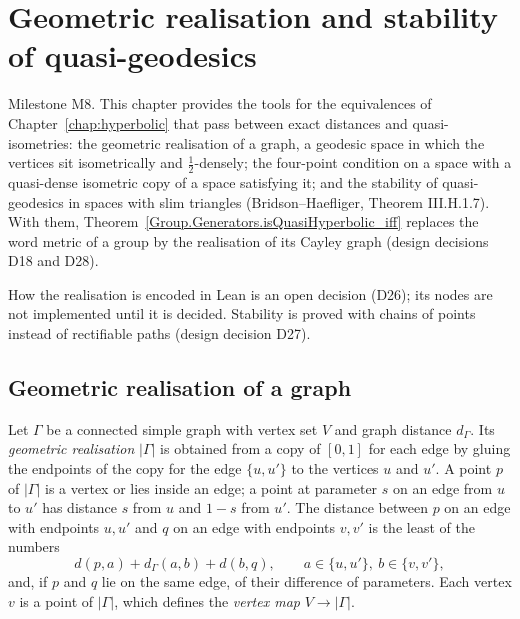 \chapter{Geometric realisation and stability of quasi-geodesics}
\label{chap:stability}

Milestone M8. This chapter provides the tools for the equivalences of
Chapter~\ref{chap:hyperbolic} that pass between exact distances and quasi-isometries: the
geometric realisation of a graph, a geodesic space in which the vertices sit isometrically and
$\frac12$-densely; the four-point condition on a space with a quasi-dense isometric copy of a
space satisfying it; and the stability of quasi-geodesics in spaces with slim triangles
(Bridson--Haefliger, Theorem III.H.1.7). With them,
Theorem~\ref{Group.Generators.isQuasiHyperbolic_iff} replaces the word metric of a group by the
realisation of its Cayley graph (design decisions D18 and D28).

How the realisation is encoded in Lean is an open decision (D26); its nodes are not implemented
until it is decided. Stability is proved with chains of points instead of rectifiable paths (design
decision D27).

\section*{Geometric realisation of a graph}

\begin{definition}
  \label{SimpleGraph.Realization}
  Let $\Gamma$ be a connected simple graph with vertex set $V$ and graph distance $d_\Gamma$. Its
  \emph{geometric realisation} $|\Gamma|$ is obtained from a copy of $[0, 1]$ for each edge by
  gluing the endpoints of the copy for the edge $\{u, u'\}$ to the vertices $u$ and $u'$. A point
  $p$ of $|\Gamma|$ is a vertex or lies inside an edge; a point at parameter $s$ on an edge from $u$
  to $u'$ has distance $s$ from $u$ and $1 - s$ from $u'$. The distance between $p$ on an edge with
  endpoints $u, u'$ and $q$ on an edge with endpoints $v, v'$ is the least of the numbers
  \[ d(p, a) + d_\Gamma(a, b) + d(b, q), \qquad a \in \{u, u'\},\ b \in \{v, v'\}, \]
  and, if $p$ and $q$ lie on the same edge, of their difference of parameters. Each vertex $v$ is a
  point of $|\Gamma|$, which defines the \emph{vertex map} $V \to |\Gamma|$.
\end{definition}

